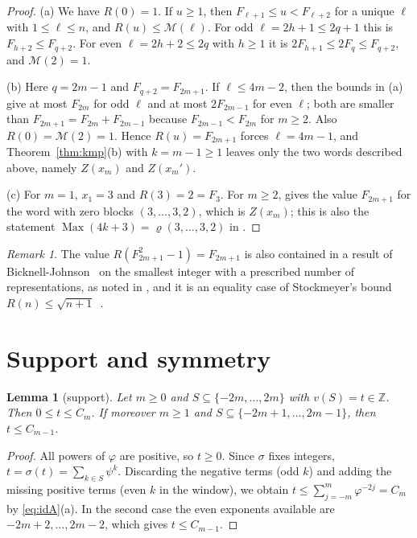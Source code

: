 \documentclass[11pt]{amsart}
\newtheorem{lemma}[theorem]{Lemma}
\theoremstyle{definition}
\theoremstyle{remark}
\newtheorem{remark}[theorem]{Remark}
\numberwithin{equation}{section}
\newcommand{\Z}{\mathbb{Z}}
\newcommand{\val}{v}
\begin{document}
\begin{proof}
(a) We have $R(0)=1$. If $u\ge1$, then $F_{\ell+1}\le u<F_{\ell+2}$ for a unique $\ell$ with
$1\le\ell\le n$, and $R(u)\le\mathcal M(\ell)$. For odd $\ell=2h+1\le 2q+1$ this is
$F_{h+2}\le F_{q+2}$. For even $\ell=2h+2\le2q$ with $h\ge1$ it is $2F_{h+1}\le2F_q\le F_{q+2}$, and
$\mathcal M(2)=1$.

(b) Here $q=2m-1$ and $F_{q+2}=F_{2m+1}$. If $\ell\le 4m-2$, then the bounds in (a) give at most
$F_{2m}$ for odd $\ell$ and at most $2F_{2m-1}$ for even $\ell$; both are smaller than
$F_{2m+1}=F_{2m}+F_{2m-1}$ because $F_{2m-1}<F_{2m}$ for $m\ge2$. Also $R(0)=\mathcal M(2)=1$. Hence
$R(u)=F_{2m+1}$ forces $\ell=4m-1$, and Theorem~\ref{thm:kmp}(b) with $k=m-1\ge1$ leaves only the two
words described above, namely $Z(x_m)$ and $Z(x_m')$.

(c) For $m=1$, $x_1=3$ and $R(3)=2=F_3$. For $m\ge2$, \cite[Lemma~3.1(2)]{KMP2005} gives the value
$F_{2m+1}$ for the word with zero blocks $(3,\dots,3,2)$, which is $Z(x_m)$; this is also the
statement $\operatorname{Max}(4k+3)=\varrho(3,\dots,3,2)$ in \cite[Corollary~5.1(i)]{KMP2005}.
\end{proof}

\begin{remark}
The value $R(F_{2m+1}^2-1)=F_{2m+1}$ is also contained in a result of
Bicknell-Johnson~\cite{BicknellJohnson1999} on the smallest integer with a prescribed number of
representations, as noted in \cite[Remark after
Proposition~5.4]{KMP2005}, and it is an equality case of Stockmeyer's bound
$R(n)\le\sqrt{n+1}$~\cite{Stockmeyer2009}.
\end{remark}

\section{Support and symmetry}\label{sec:support}

\begin{lemma}[support]\label{lem:support}
Let $m\ge0$ and $S\subseteq\{-2m,\dots,2m\}$ with $\val(S)=t\in\Z$. Then $0\le t\le C_m$. If
moreover $m\ge1$ and $S\subseteq\{-2m+1,\dots,2m-1\}$, then $t\le C_{m-1}$.
\end{lemma}

\begin{proof}
All powers of $\varphi$ are positive, so $t\ge0$. Since $\sigma$ fixes integers,
$t=\sigma(t)=\sum_{k\in S}\psi^k$. Discarding the negative terms (odd $k$) and adding the missing
positive terms (even $k$ in the window), we obtain
$t\le\sum_{j=-m}^{m}\varphi^{-2j}=C_m$ by \eqref{eq:idA}(a). In the second case the even exponents
available are $-2m+2,\dots,2m-2$, which gives $t\le C_{m-1}$.
\end{proof}
\end{document}
